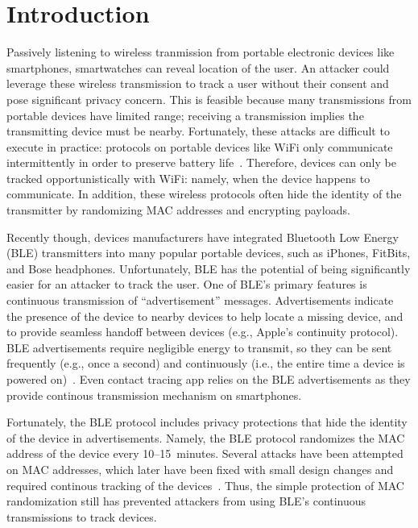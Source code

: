 \section{Introduction}
\label{sec:intro}

Passively listening to wireless tranmission from portable electronic devices like  
smartphones, smartwatches can reveal location of the user. An attacker could leverage these 
wireless transmission to track a user without their consent and pose significant privacy concern.  
This is feasible because many transmissions from portable devices have limited
range; receiving a transmission implies the transmitting device must be nearby.
Fortunately, these attacks are difficult to execute in practice: protocols on
portable devices like WiFi only communicate intermittently in
order to preserve battery life~\cite{}. Therefore, devices can only be tracked 
opportunistically with WiFi: namely, when the device happens to communicate. In addition,
these wireless protocols often hide the identity of the transmitter by randomizing
MAC addresses and encrypting payloads.
%



Recently though, devices manufacturers have integrated Bluetooth Low Energy
(BLE) transmitters into many popular portable devices, such as iPhones,
FitBits, and Bose headphones. Unfortunately, BLE has the potential of being
significantly easier for an attacker to track the user. One of BLE's primary features
is continuous transmission of ``advertisement'' messages.  Advertisements
indicate the presence of the device to nearby devices to help locate a missing
device, and to provide seamless handoff between devices (e.g., Apple's
continuity protocol). BLE advertisements require negligible energy to transmit,
so they can be sent frequently (e.g., once a second) and continuously (i.e.,
the entire time a device is powered on)~\cite{}. Even contact tracing app relies on the BLE advertisements as they provide continous transmission mechanism on smartphones. 


Fortunately, the BLE protocol includes privacy protections that hide the identity of
the device in advertisements. Namely, the BLE protocol randomizes the MAC address of the
device every 10--15~minutes. Several attacks have been attempted on MAC addresses, which
later have been fixed with small design changes and required continous tracking of the
devices~\cite{Iphonetracking_becker,MACRandomizationfail_Martin}.  Thus, the simple protection of MAC randomization still has prevented 
attackers from using BLE's continuous transmissions to track devices. 



